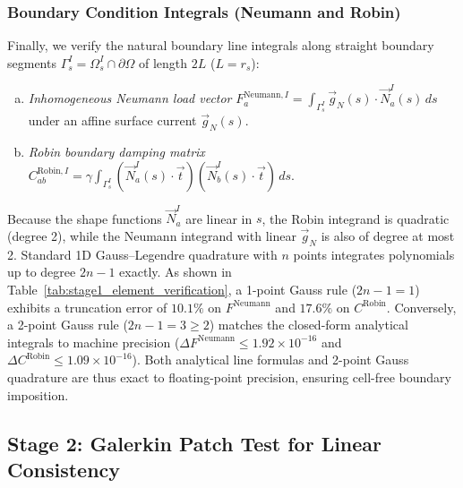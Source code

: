 \documentclass[VANCOUVER,Times1COL]{WileyNJD-v5}
\begin{document}
\subsubsection{Boundary Condition Integrals (Neumann and Robin)}
Finally, we verify the natural boundary line integrals along straight boundary segments $\Gamma_s^I = \Omega_s^I \cap \partial\Omega$ of length $2L$ ($L = r_s$):
\begin{enumerate}[(a)]
    \item \textit{Inhomogeneous Neumann load vector} $F_a^{\mathrm{Neumann}, I} = \int_{\Gamma_s^I} \vec{g}_N(s) \cdot \vec{N}_a^I(s) \, ds$ under an affine surface current $\vec{g}_N(s)$.
    \item \textit{Robin boundary damping matrix} $C_{ab}^{\mathrm{Robin}, I} = \gamma \int_{\Gamma_s^I} (\vec{N}_a^I(s) \cdot \vec{t})(\vec{N}_b^I(s) \cdot \vec{t}) \, ds$.
\end{enumerate}
Because the shape functions $\vec{N}_a^I$ are linear in $s$, the Robin integrand is quadratic (degree 2), while the Neumann integrand with linear $\vec{g}_N$ is also of degree at most 2. Standard 1D Gauss--Legendre quadrature with $n$ points integrates polynomials up to degree $2n - 1$ exactly. As shown in Table~\ref{tab:stage1_element_verification}, a 1-point Gauss rule ($2n-1 = 1$) exhibits a truncation error of $10.1\%$ on $F^{\mathrm{Neumann}}$ and $17.6\%$ on $C^{\mathrm{Robin}}$. Conversely, a 2-point Gauss rule ($2n-1 = 3 \ge 2$) matches the closed-form analytical integrals to machine precision ($\Delta F^{\mathrm{Neumann}} \le 1.92 \times 10^{-16}$ and $\Delta C^{\mathrm{Robin}} \le 1.09 \times 10^{-16}$). Both analytical line formulas and 2-point Gauss quadrature are thus exact to floating-point precision, ensuring cell-free boundary imposition.

\subsection{Stage 2: Galerkin Patch Test for Linear Consistency}
\label{subsec:stage2_patch_test}
\end{document}
